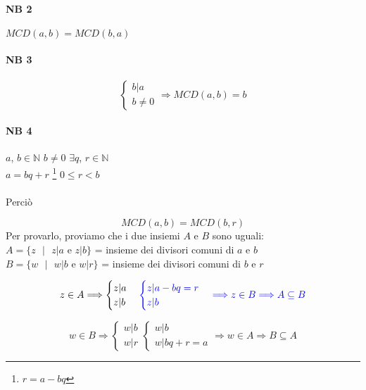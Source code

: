     \paragraph{NB 2} $MCD(a,b) = MCD(b,a)$
    \paragraph{NB 3}  
     \begin{equation} 
         \begin{cases}
            b|a \\
            b\neq 0
         \end{cases}
    \Longrightarrow 
         MCD(a,b)=b
    \end{equation} 
    \paragraph{NB 4} $a$, $b\in\mathbb{N}$ $b\neq 0$ \hspace{1cm} $\exists q$, $r\in\mathbb{N}$\\
    $a=bq+r$ \footnote{$r=a-bq$} \hspace{3cm} $0\leq r < b$\\\\
    Perciò
    \begin{center}
        {\Large $$MCD(a,b) = MCD(b,r)$$}
        Per provarlo, proviamo che i due insiemi $A$ e $B$ sono uguali:\\
        $A=\{z\textrm{ $|$ } z|a \textrm{ e } z|b\}$ = insieme dei divisori comuni di $a$ e $b$\\
        $B=\{w\textrm{ $|$ } w|b \textrm{ e } w|r\}$ = insieme dei divisori comuni di $b$ e $r$
    \end{center}

    $$
    z\in A \Longrightarrow    
    \begin{cases}
        z|a\\
        z|b
    \end{cases}
    \color{blue}
    \begin{cases}
        z|a-bq=r\\
        z|b
    \end{cases}
    \Longrightarrow z\in B \Longrightarrow A\subseteq B
    $$

    \color{green}
    $$
    w\in B \Longrightarrow    
    \begin{cases}
        w|b\\
        w|r
    \end{cases}
    \begin{cases}
        w|b\\
        w|bq+r=a
    \end{cases}
    \Longrightarrow w\in A \Longrightarrow B\subseteq A
    $$
    \color{black}
